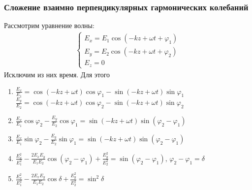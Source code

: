\documentclass[10pt,pdf,hyperref={unicode}, dvipsnames]{beamer}
\begin{document}
\begin{frame}
	\frametitle{Сложение взаимно перпендикулярных гармонических колебаний}
	Рассмотрим уравнение волны: 
	\begin{gather*} 
		\begin{cases} 
			E_x = E_1\cos\left(-kz+\omega t+\varphi_1\right) \\ 
			E_y = E_2\cos\left(-kz+\omega t+\varphi_2\right) \\ 
			E_z = 0 
		\end{cases}
	\end{gather*}
	Исключим из них время. Для этого 
	\begin{enumerate} 
		\item %
		      $\frac{E_x}{E_1}=\cos(-{k}{z}+\omega t)\cos\varphi_1-\sin(-kz+\omega t)\sin\varphi_1$\\ %
		      $\frac{E_y}{E_2}=\cos(-kz+\omega t)\cos\varphi_2-\sin(-kz+\omega t)\sin\varphi_2$ %
		\item 
		      $\frac{E_x}{E_1}\cos\varphi_2-\frac{E_y}{E_2}\cos\varphi_1=\sin(-kz+\omega t)\sin(\varphi_2-\varphi_1)$
		\item 
		      $\frac{E_x}{E_1}\sin\varphi_2-\frac{E_y}{E_2}\sin\varphi_1=\sin(-kz+\omega t)\sin(\varphi_2-\varphi_1)$
		\item 
		      $\frac{E_x^2}{E_1^2}-\frac{2E_xE_y}{E_1E_2}\cos(\varphi_2-\varphi_1)+\frac{E_y^2}{E_2^2}=\sin(\varphi_2-\varphi_1)$, 
		      $\varphi_2-\varphi_1=\delta$
		\item $\frac{E_x^2}{E_1^2}-\frac{2E_xE_y}{E_1E_2}\cos\delta+\frac{E_y^2}{E_2^2}=\sin^2\delta$
	\end{enumerate}
\end{frame}

\end{document}
